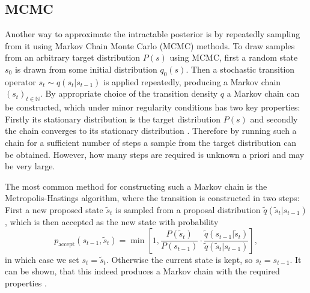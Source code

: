 \documentclass[12pt]{scrartcl}
\begin{document}
\subsection{MCMC}
\label{sec:MCMC}


Another way to approximate the intractable posterior is by repeatedly sampling from it using Markov Chain Monte Carlo (MCMC) methods. To draw samples from an arbitrary target distribution $P(s)$ using MCMC, first a random state $s_0$ is drawn from some initial distribution $q_0(s)$. Then a stochastic transition operator $s_{t} \sim q(s_t|s_{t-1})$ is applied repeatedly, producing a Markov chain $(s_t)_{t \in \mathbb{N}}$. By appropriate choice of the transition density $q$ a Markov chain can be constructed, which under minor regularity conditions has two key properties: Firstly its stationary distribution is the target distribution $P(s)$ and secondly the chain converges to its stationary distribution \citep{Roberts2004}. Therefore by running such a chain for a sufficient number of steps a sample from the target distribution can be obtained. However, how many steps are required is unknown a priori and may be very large.

The most common method for constructing such a Markov chain is the Metropolis-Hastings algorithm, where the transition is constructed in two steps: First a new proposed state $\tilde{s}_t$ is sampled from a proposal distribution $\tilde{q}(\tilde{s}_t|s_{t-1})$, which is then accepted as the new state with probability 
\begin{equation} \label{eq:Metropolis-Hastings}
p_{\textrm{accept}}(s_{t-1}, \tilde{s}_t) = \min \left[ 1, \frac{P(\tilde{s}_t)}{P(s_{t-1})} \cdot \frac{\tilde{q}(s_{t-1}|\tilde{s}_t)}{\tilde{q}(\tilde{s}_t|s_{t-1})} \right],
\end{equation}
in which case we set $s_t = \tilde{s}_t$. Otherwise the current state is kept, so $s_t = s_{t-1}$. It can be shown, that this indeed produces a Markov chain with the required properties \citep{Roberts2004}. 
\end{document}
